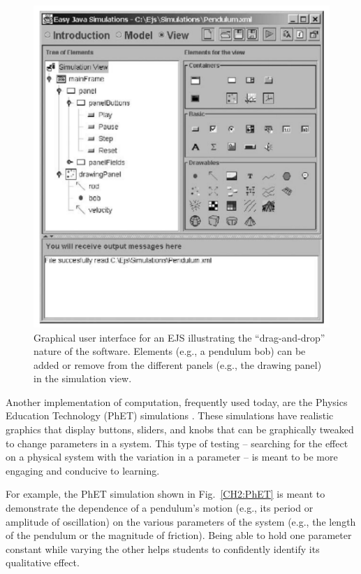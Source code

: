 \documentclass{msuphddissertation}
\begin{document}
\begin{doublespace}
\begin{figure}\center
\includegraphics[scale=0.40]{images/CH2EJS.pdf}
\caption{Graphical user interface for an EJS illustrating the ``drag-and-drop'' nature of the software.  Elements (e.g., a pendulum bob) can be added or remove from the different panels (e.g., the drawing panel) in the simulation view.}\label{CH2:EJS}
\end{figure}

Another implementation of computation, frequently used today, are the Physics Education Technology (PhET) simulations \cite{Perkins2006}.  These simulations have realistic graphics that display buttons, sliders, and knobs that can be graphically tweaked to change parameters in a system.  This type of testing -- searching for the effect on a physical system with the variation in a parameter -- is meant to be more engaging and conducive to learning.

For example, the PhET simulation shown in Fig.~\ref{CH2:PhET} is meant to demonstrate the dependence of a pendulum's motion (e.g., its period or amplitude of oscillation) on the various parameters of the system (e.g., the length of the pendulum or the magnitude of friction).  Being able to hold one parameter constant while varying the other helps students to confidently identify its qualitative effect.


\end{doublespace}
\end{document}
